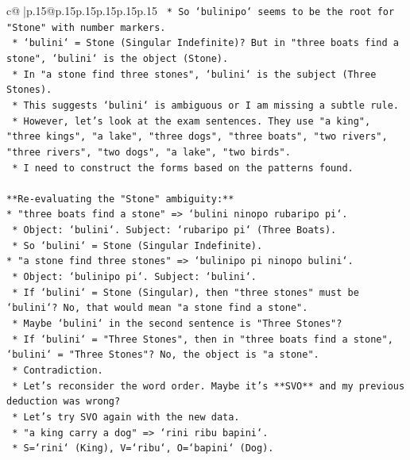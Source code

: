 \documentclass{article}
\begin{document}
{\begin{supertabular}{c@{$\;$}|p{.15\linewidth}@{}p{.15\linewidth}p{.15\linewidth}p{.15\linewidth}p{.15\linewidth}p{.15\linewidth}}
{{{\texttt{    *   So `bulinipo` seems to be the root for "Stone" with number markers.} \\
\texttt{    *   `bulini` = Stone (Singular Indefinite)? But in "three boats find a stone", `bulini` is the object (Stone).} \\
\texttt{    *   In "a stone find three stones", `bulini` is the subject (Three Stones).} \\
\texttt{    *   This suggests `bulini` is ambiguous or I am missing a subtle rule.} \\
\texttt{    *   However, let's look at the exam sentences. They use "a king", "three kings", "a lake", "three dogs", "three boats", "two rivers", "three rivers", "two dogs", "a lake", "two birds".} \\
\texttt{    *   I need to construct the forms based on the patterns found.} \\
\\ 
\texttt{**Re{-}evaluating the "Stone" ambiguity:**} \\
\texttt{*   "three boats find a stone" => `bulini ninopo rubaripo pi`.} \\
\texttt{    *   Object: `bulini`. Subject: `rubaripo pi` (Three Boats).} \\
\texttt{    *   So `bulini` = Stone (Singular Indefinite).} \\
\texttt{*   "a stone find three stones" => `bulinipo pi ninopo bulini`.} \\
\texttt{    *   Object: `bulinipo pi`. Subject: `bulini`.} \\
\texttt{    *   If `bulini` = Stone (Singular), then "three stones" must be `bulini`? No, that would mean "a stone find a stone".} \\
\texttt{    *   Maybe `bulini` in the second sentence is "Three Stones"?} \\
\texttt{    *   If `bulini` = "Three Stones", then in "three boats find a stone", `bulini` = "Three Stones"? No, the object is "a stone".} \\
\texttt{    *   Contradiction.} \\
\texttt{    *   Let's reconsider the word order. Maybe it's **SVO** and my previous deduction was wrong?} \\
\texttt{    *   Let's try SVO again with the new data.} \\
\texttt{    *   "a king carry a dog" => `rini ribu bapini`.} \\
\texttt{        *   S=`rini` (King), V=`ribu`, O=`bapini` (Dog).} \\
}}}
\end{supertabular}}
\end{document}
